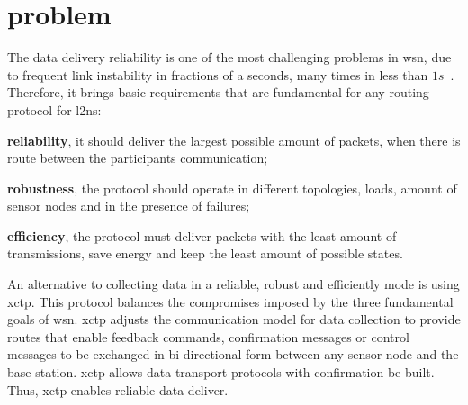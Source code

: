 \section{problem}
\label{sec:problem}


The data delivery reliability is one of the most challenging problems in \ac{wsn}, due to frequent link instability in fractions of a seconds, many times in less than $1s$~\cite{betaFactor}. Therefore, it brings basic requirements that are fundamental for any routing protocol for \ac{l2ns}: 
\begin{inparaenum}
    \item \textbf{reliability}, it should deliver the largest possible amount of packets, when there is route between the participants communication;
    \item \textbf{robustness}, the protocol should operate in different topologies, loads, amount of sensor nodes and in the presence of failures;
    \item \textbf{efficiency}, the protocol must deliver packets with the least amount of transmissions, save energy and keep the least amount of possible states.
\end{inparaenum}


An alternative to collecting data in a reliable, robust and efficiently mode is using \ac{xctp}. This protocol balances the compromises imposed by the three fundamental goals of \ac{wsn}. \ac{xctp} adjusts the communication model for data collection to provide routes that enable feedback commands, confirmation messages  or control messages to be exchanged in bi-directional form between any sensor node and the base station. \ac{xctp} allows data transport protocols with confirmation be built. Thus, \ac{xctp} enables reliable data deliver.